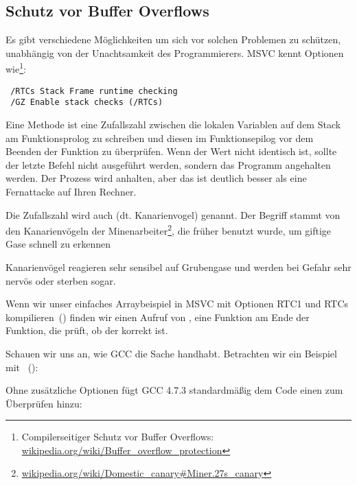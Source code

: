 \subsection{Schutz vor Buffer Overflows}
\label{subsec:BO_protection}
Es gibt verschiedene Möglichkeiten um sich vor solchen Problemen zu schützen, unabhängig von der Unachtsamkeit des \CCpp
Programmierers. MSVC kennt Optionen wie\footnote{Compilerseitiger Schutz vor Buffer Overflows:
\href{http://go.yurichev.com/17133}{wikipedia.org/wiki/Buffer\_overflow\_protection}}:

\begin{lstlisting}
 /RTCs Stack Frame runtime checking
 /GZ Enable stack checks (/RTCs)
\end{lstlisting}

Eine Methode ist eine Zufallszahl zwischen die lokalen Variablen auf dem Stack am Funktionsprolog zu schreiben und
diesen im Funktionsepilog vor dem Beenden der Funktion zu überprüfen.
Wenn der Wert nicht identisch ist, sollte der letzte \RET Befehl nicht ausgeführt werden, sondern das Programm
angehalten werden. Der Prozess wird anhalten, aber das ist deutlich besser als eine Fernattacke auf Ihren Rechner.
    
\newcommand{\CANARYURL}{\href{http://go.yurichev.com/17134}{wikipedia.org/wiki/Domestic\_canary\#Miner.27s\_canary}}

Die Zufallszahl wird auch  (dt. Kanarienvogel) genannt. Der Begriff stammt von den Kanarienvögeln der
Minenarbeiter\footnote{\CANARYURL}, die früher benutzt wurde, um giftige Gase schnell zu erkennen

Kanarienvögel reagieren sehr sensibel auf Grubengase und werden bei Gefahr sehr nervös oder sterben sogar.

Wenn wir unser einfaches Arraybeispiel in \ac{MSVC} mit Optionen RTC1 und RTCs kompilieren~()
finden wir einen Aufruf von , eine Funktion am Ende der Funktion, die prüft, ob der
 korrekt ist.

Schauen wir uns an, wie GCC die Sache handhabt.
Betrachten wir ein Beispiel mit ~():


Ohne zusätzliche Optionen fügt GCC 4.7.3 standardmäßig dem Code einen  zum Überprüfen hinzu:



